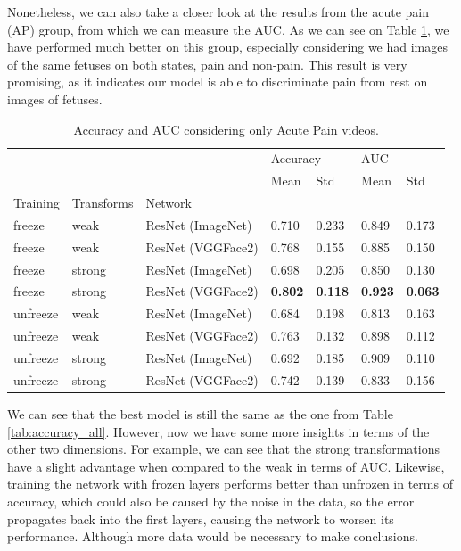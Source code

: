 Nonetheless, we can also take a closer look at the results from the acute pain (AP) group, from which we can measure the AUC. As we can see on Table \ref{tab:accuracy_auc_ap}, we have performed much better on this group, especially considering we had images of the same fetuses on both states, pain and non-pain. This result is very promising, as it indicates our model is able to discriminate pain from rest on images of fetuses.

\begin{table}[h!tp]
\centering
\caption{Accuracy and AUC considering only Acute Pain videos.}
\label{tab:accuracy_auc_ap} 
\begin{tabular}{lllllll}
\toprule
         &        &          & \multicolumn{2}{l}{Accuracy} & \multicolumn{2}{l}{AUC} \\
         &        &          &      Mean &       Std &      Mean &       Std \\
Training & Transforms & Network &           &           &           &           \\
\midrule
freeze   & weak   & ResNet (ImageNet) &  0.710 &  0.233 &  0.849 &  0.173 \\
freeze   & weak   & ResNet (VGGFace2) &  0.768 &  0.155 &  0.885 &  0.150 \\
freeze   & strong & ResNet (ImageNet) &  0.698 &  0.205 &  0.850 &  0.130 \\
freeze   & strong & ResNet (VGGFace2) &  \textbf{0.802} & \textbf{ 0.118} &  \textbf{0.923} &  \textbf{0.063} \\
unfreeze & weak   & ResNet (ImageNet) &  0.684 &  0.198 &  0.813 &  0.163 \\
unfreeze & weak   & ResNet (VGGFace2) &  0.763 &  0.132 &  0.898 &  0.112 \\
unfreeze & strong & ResNet (ImageNet) &  0.692 &  0.185 &  0.909 &  0.110 \\
unfreeze & strong & ResNet (VGGFace2) &  0.742 &  0.139 &  0.833 &  0.156 \\
\bottomrule
\end{tabular}
\end{table}

We can see that the best model is still the same as the one from Table \ref{tab:accuracy_all}. However, now we have some more insights in terms of the other two dimensions. For example, we can see that the strong transformations have a slight advantage when compared to the weak in terms of AUC. Likewise, training the network with frozen layers performs better than unfrozen in terms of accuracy, which could also be caused by the noise in the data, so the error propagates back into the first layers, causing the network to worsen its performance. Although more data would be necessary to make conclusions.

